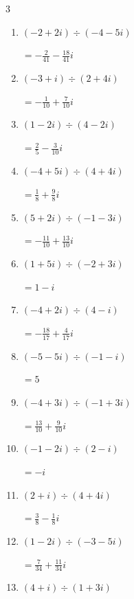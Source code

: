 \begin{multicols}{3}
\begin{enumerate}
  \item $\displaystyle (-2+2i)\div(-4-5i)$

        $\displaystyle =-\frac{2}{41}-\frac{18}{41}i$

  \item $\displaystyle (-3+i)\div(2+4i)$

        $\displaystyle =-\frac{1}{10}+\frac{7}{10}i$

  \item $\displaystyle (1-2i)\div(4-2i)$

        $\displaystyle =\frac{2}{5}-\frac{3}{10}i$

  \item $\displaystyle (-4+5i)\div(4+4i)$

        $\displaystyle =\frac{1}{8}+\frac{9}{8}i$

  \item $\displaystyle (5+2i)\div(-1-3i)$

        $\displaystyle =-\frac{11}{10}+\frac{13}{10}i$

\columnbreak %

  \item $\displaystyle (1+5i)\div(-2+3i)$

        $\displaystyle =1-i$

  \item $\displaystyle (-4+2i)\div(4-i)$

        $\displaystyle =-\frac{18}{17}+\frac{4}{17}i$

  \item $\displaystyle (-5-5i)\div(-1-i)$

        $\displaystyle =5$

  \item $\displaystyle (-4+3i)\div(-1+3i)$

        $\displaystyle =\frac{13}{10}+\frac{9}{10}i$

  \item $\displaystyle (-1-2i)\div(2-i)$

        $\displaystyle =-i$

  \item $\displaystyle (2+i)\div(4+4i)$

        $\displaystyle =\frac{3}{8}-\frac{1}{8}i$

  \item $\displaystyle (1-2i)\div(-3-5i)$

        $\displaystyle =\frac{7}{34}+\frac{11}{34}i$

  \item $\displaystyle (4+i)\div(1+3i)$


\end{enumerate}
\end{multicols}
